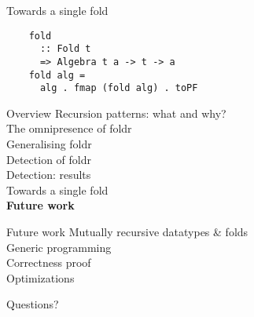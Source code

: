 \documentclass[20pt]{beamer}
\begin{document}
\begin{frame}[fragile]{Towards a single fold}
    \begin{lstlisting}
    fold
      :: Fold t
      => Algebra t a -> t -> a
    fold alg =
      alg . fmap (fold alg) . toPF
    \end{lstlisting}
\end{frame}


\begin{frame}{Overview}
    Recursion patterns: what and why? \\
    The omnipresence of foldr \\
    Generalising foldr \\
    Detection of foldr \\
    Detection: results \\
    Towards a single fold \\
    \textbf{Future work} \\
\end{frame}

\begin{frame}{Future work}
    Mutually recursive datatypes \& folds \\
    Generic programming \\
    Correctness proof \\
    Optimizations \\
\end{frame}


\begin{frame}{}
    \begin{center}
    \center\huge{Questions?}
    \end{center}
\end{frame}
\end{document}
